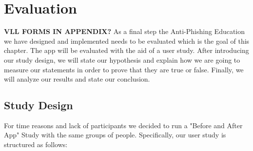 \section{Evaluation}
\label{s:evaluation}
\textbf{VLL FORMS IN APPENDIX? }As a final step the Anti-Phishing Education we have designed and implemented needs to be evaluated which is the goal of this chapter. The app will be evaluated with the aid of a user study. After introducing our study design, we will state our hypothesis and explain how we are going to measure our statements in order to prove that they are true or false. Finally, we will analyze our results and state our conclusion.



\subsection{Study Design}
For time reasons and lack of participants we decided to run a "Before and After App" Study with the same groups of people. Specifically, our user study is structured as follows:

